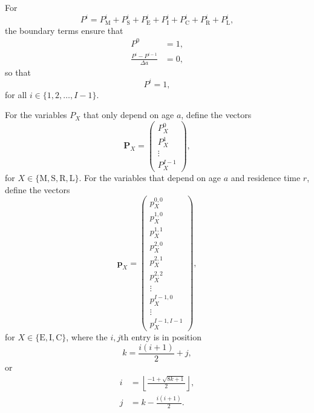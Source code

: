 \documentclass[12pt]{article}
\renewcommand{\vec}[1]{\mathbf{#1}}
\begin{document}
For
\begin{equation}
  P^i = P_{\mathrm{M}}^i + P_{\mathrm{S}}^i + P_{\mathrm{E}}^i
  + P_{\mathrm{I}}^i + P_{\mathrm{C}}^i + P_{\mathrm{R}}^i
  + P_{\mathrm{L}}^i,
\end{equation}
the boundary terms ensure that
\begin{align}
  P^0 &= 1,
  \\
  \frac{P^i - P^{i - 1}}{\Delta a} &= 0,
\end{align}
so that
\begin{equation}
  P^i = 1,
\end{equation}
for all $i \in \{1, 2, \ldots, I - 1\}$.

For the variables $P_X$ that only depend on age $a$,
define the vectors
\begin{equation}
  \vec{P}_X =
  \begin{pmatrix}
    P_X^0\\
    P_X^1\\
    \vdots\\
    P_X^{I - 1}
  \end{pmatrix},
\end{equation}
for $X \in \{\mathrm{M}, \mathrm{S}, \mathrm{R}, \mathrm{L}\}$.
For the variables that depend on age $a$ and residence time $r$,
define the vectors
\begin{equation}
  \vec{p}_X =
  \begin{pmatrix}
    p_X^{0, 0}\\
    p_X^{1, 0}\\
    p_X^{1, 1}\\
    p_X^{2, 0}\\
    p_X^{2, 1}\\
    p_X^{2, 2}\\
    \vdots\\
    p_X^{I - 1, 0}\\
    \vdots\\
    p_X^{I - 1, I - 1}
  \end{pmatrix},
\end{equation}
for $X \in \{\mathrm{E}, \mathrm{I}, \mathrm{C}\}$,
where the $i, j$th entry is in position
\begin{equation}
  k = \frac{i (i + 1)}{2} + j,
\end{equation}
or
\begin{align}
  i &= \left\lfloor\frac{- 1 + \sqrt{8 k + 1}}{2}\right\rfloor,
  \\
  j &= k - \frac{i (i + 1)}{2}.
\end{align}
\end{document}
